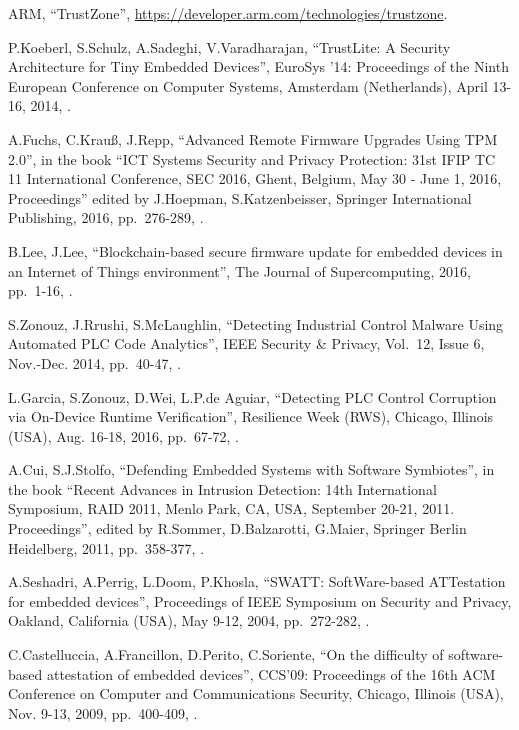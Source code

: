 \begin{thebibliography}{99}
ARM,
``TrustZone'',
\url{https://developer.arm.com/technologies/trustzone}.

P.Koeberl, S.Schulz, A.Sadeghi, V.Varadharajan,
``TrustLite: A Security Architecture for Tiny Embedded Devices'',
EuroSys '14: Proceedings of the Ninth European Conference on Computer Systems,
Amsterdam (Netherlands), April 13-16, 2014,
.

A.Fuchs, C.Krau{\ss}, J.Repp,
``Advanced Remote Firmware Upgrades Using TPM 2.0'',
in the book ``ICT Systems Security and Privacy Protection: 31st IFIP TC 11 International Conference, SEC 2016, Ghent, Belgium, May 30 - June 1, 2016, Proceedings''
edited by J.Hoepman, S.Katzenbeisser,
Springer International Publishing, 2016,
pp.\ 276-289,
.

B.Lee, J.Lee,
``Blockchain-based secure firmware update for embedded devices in an Internet of Things environment'',
The Journal of Supercomputing, 2016,
pp.\ 1-16,
.

S.Zonouz, J.Rrushi, S.McLaughlin,
``Detecting Industrial Control Malware Using Automated PLC Code Analytics'',
IEEE Security \& Privacy,
Vol.\ 12, Issue 6,
Nov.-Dec. 2014,
pp.\ 40-47,
.

L.Garcia, S.Zonouz, D.Wei, L.P.de Aguiar,
``Detecting PLC Control Corruption via On-Device Runtime Verification'',
Resilience Week (RWS),
Chicago, Illinois (USA), Aug. 16-18, 2016,
pp.\ 67-72,
.

A.Cui, S.J.Stolfo,
``Defending Embedded Systems with Software Symbiotes'',
in the book ``Recent Advances in Intrusion Detection: 14th International Symposium, RAID 2011, Menlo Park, CA, USA, September 20-21, 2011. Proceedings'',
edited by R.Sommer, D.Balzarotti, G.Maier,
Springer Berlin Heidelberg, 2011,
pp.\ 358-377,
.

A.Seshadri, A.Perrig, L.Doom, P.Khosla,
``SWATT: SoftWare-based ATTestation for embedded devices'',
Proceedings of IEEE Symposium on Security and Privacy,
Oakland, California (USA), May 9-12, 2004,
pp.\ 272-282,
.

C.Castelluccia, A.Francillon, D.Perito, C.Soriente,
``On the difficulty of software-based attestation of embedded devices'',
CCS'09: Proceedings of the 16th ACM Conference on Computer and Communications Security,
Chicago, Illinois (USA), Nov. 9-13, 2009,
pp.\ 400-409,
.


\end{thebibliography}
